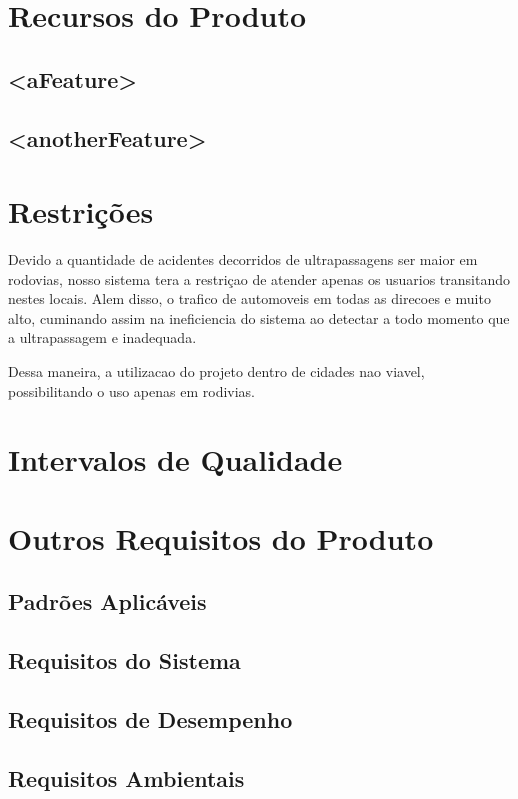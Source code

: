 \section{Recursos do Produto}

\subsection{<aFeature>}

\subsection{<anotherFeature>}


\section{Restrições}
Devido a quantidade de acidentes decorridos de ultrapassagens ser maior em rodovias, nosso sistema tera a restriçao de atender apenas os usuarios transitando nestes locais. Alem disso, o trafico de automoveis em todas as direcoes e muito alto, cuminando assim na ineficiencia do sistema ao detectar a todo momento que a ultrapassagem e inadequada. 

Dessa maneira, a utilizacao do projeto dentro de cidades nao viavel, possibilitando o uso apenas em rodivias.

\section{Intervalos de Qualidade}

\section{Outros Requisitos do Produto}

\subsection{Padrões Aplicáveis}

\subsection{Requisitos do Sistema}

\subsection{Requisitos de Desempenho }

\subsection{Requisitos Ambientais}

